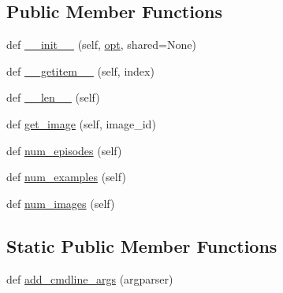 \subsection*{Public Member Functions}
\begin{DoxyCompactItemize}
\item 
def \hyperlink{classparlai_1_1tasks_1_1flickr30k_1_1agents_1_1FlickrDataset_a4d5c2bd105faaff6ee0d5ce0e41a6d94}{\+\_\+\+\_\+init\+\_\+\+\_\+} (self, \hyperlink{classparlai_1_1tasks_1_1flickr30k_1_1agents_1_1FlickrDataset_a0c37a007795dcd51a466d3420a3a1302}{opt}, shared=None)
\item 
def \hyperlink{classparlai_1_1tasks_1_1flickr30k_1_1agents_1_1FlickrDataset_aba1193cd19baf55824c0ec3bd735b56f}{\+\_\+\+\_\+getitem\+\_\+\+\_\+} (self, index)
\item 
def \hyperlink{classparlai_1_1tasks_1_1flickr30k_1_1agents_1_1FlickrDataset_a2ff37f962e9df151e2bce0140dc65aa1}{\+\_\+\+\_\+len\+\_\+\+\_\+} (self)
\item 
def \hyperlink{classparlai_1_1tasks_1_1flickr30k_1_1agents_1_1FlickrDataset_af2517dc3b4a7670305ad9a517a8d49c1}{get\+\_\+image} (self, image\+\_\+id)
\item 
def \hyperlink{classparlai_1_1tasks_1_1flickr30k_1_1agents_1_1FlickrDataset_aa973995adc1552143c69474ead14fa59}{num\+\_\+episodes} (self)
\item 
def \hyperlink{classparlai_1_1tasks_1_1flickr30k_1_1agents_1_1FlickrDataset_ad3996cb0eb8a94dbea616391eedc1caa}{num\+\_\+examples} (self)
\item 
def \hyperlink{classparlai_1_1tasks_1_1flickr30k_1_1agents_1_1FlickrDataset_ae852a42b9e4d9e2f4aa6291c7faf6981}{num\+\_\+images} (self)
\end{DoxyCompactItemize}
\subsection*{Static Public Member Functions}
\begin{DoxyCompactItemize}
\item 
def \hyperlink{classparlai_1_1tasks_1_1flickr30k_1_1agents_1_1FlickrDataset_a2dd3179eae6116b6b43567fc8e4ecc3c}{add\+\_\+cmdline\+\_\+args} (argparser)
\end{DoxyCompactItemize}
